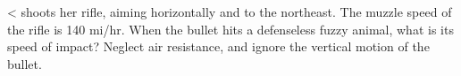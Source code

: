<%
shoots her rifle, aiming horizontally and to the northeast.
The muzzle speed of the rifle is 140 mi/hr.  When the bullet
hits a defenseless fuzzy animal, what is its speed of
impact?  Neglect air resistance, and ignore the vertical
motion of the bullet.
